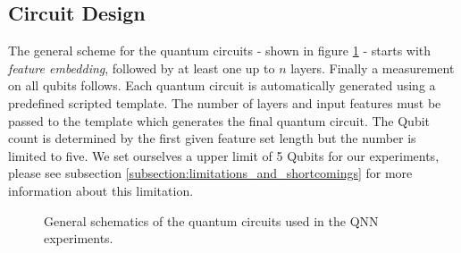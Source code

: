 \clearpage

\subsection{Circuit Design}
The general scheme for the quantum circuits - shown in figure \ref{figure:general_schematics_quantum_circuits_qnn} - starts with \textit{feature embedding}, followed by at least one up to $n$ layers. Finally a measurement on all qubits follows. Each quantum circuit is automatically generated using a predefined scripted template. The number of layers and input features must be passed to the template which generates the final quantum circuit. The Qubit count is determined by the first given feature set length but the number is limited to five. We set ourselves a upper limit of 5 Qubits for our experiments, please see subsection \ref{subsection:limitations_and_shortcomings} for more information about this limitation.

\begin{figure}[!h]
	\centering
	\caption{General schematics of the quantum circuits used in the QNN experiments.}
	\label{figure:general_schematics_quantum_circuits_qnn}
\end{figure}


